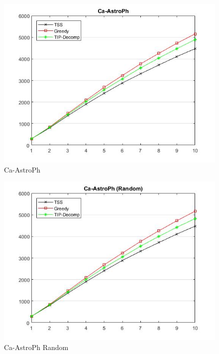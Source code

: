 \begin{figure}
	\centering
	\includegraphics[scale=0.5]{images/ca-astrophresult.jpg}
	\caption{Ca-AstroPh}
	\end{figure}
\begin{figure}
	\centering	
	\includegraphics[scale=0.5]{images/ca-astrophresultrandom.jpg}
	\caption{Ca-AstroPh Random}
	\end{figure}
